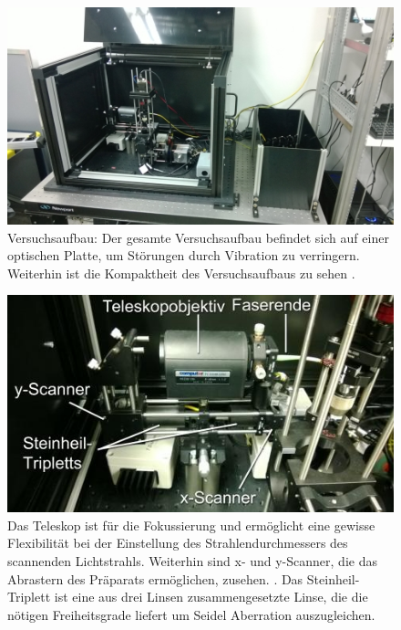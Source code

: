 \begin{figure}[H]
	\centering
\includegraphics[width=1.0\linewidth]{IMAGE/versuchsaufbau.png}
	\caption{Versuchsaufbau: Der gesamte Versuchsaufbau befindet sich auf einer optischen Platte, um Störungen durch Vibration zu verringern. Weiterhin ist die Kompaktheit des Versuchsaufbaus zu sehen \cite{Anleitung}.}
	\label{fig:versuchsaufbau}
\end{figure} 

\begin{figure}[H]
	\centering
\includegraphics[width=1.0\linewidth]{IMAGE/scanner.jpeg}
	\caption{Das Teleskop ist für die Fokussierung und ermöglicht eine gewisse Flexibilität bei der Einstellung des Strahlendurchmessers des scannenden Lichtstrahls. Weiterhin sind x- und y-Scanner, die das Abrastern des Präparats ermöglichen, zusehen. \cite{Anleitung}. Das Steinheil-Triplett ist eine aus drei Linsen zusammengesetzte Linse, die die nötigen Freiheitsgrade liefert um Seidel Aberration auszugleichen.
	}
	\label{fig:scanner}
\end{figure}

